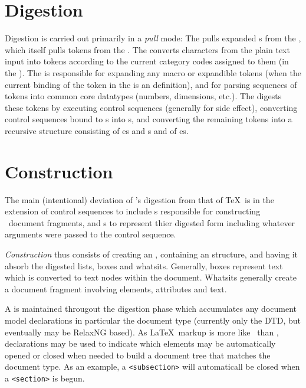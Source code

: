 \documentclass{report}
\begin{document}
\section{Digestion}\label{architecture.digestion}
Digestion is carried out primarily in a \emph{pull} mode: The 
pulls expanded s from the , which itself pulls tokens from 
the .  The  converts characters from the plain text input
into tokens according to the current category codes assigned to them (in the ).  
The  is responsible for expanding any macro or expandible
tokens (when the current binding of the token in the  is 
an  definition), 
and for parsing sequences of tokens into common core datatypes (numbers, dimensions, etc.).
The  digests these tokens by executing  control 
sequences (generally for side effect), converting control sequences bound
to s into s, and converting the remaining tokens
into a recursive structure consisting of
es and s and of es.

\section{Construction}\label{architecture.construction}
The main (intentional) deviation of \LaTeXML's digestion from that of \TeX\ is in the
extension of control sequences to include s responsible for constructing
\XML\ document fragments, and s to represent thier digested form including
whatever arguments were passed to the control sequence.

\emph{Construction} thus consists of creating an , containing
an  structure, and having it absorb the digested lists, boxes
and whatsits.  Generally, boxes represent text which is converted to text nodes within the
document. Whatsits generally create a document fragment involving elements, attributes
and text.  

A  is maintained througout the digestion phase which accumulates
any document model declarations in particular the document type (currently only
the DTD, but eventually may be RelaxNG based).  As \LaTeX\ markup is more
like \SGML\ than \XML, declarations may be used to indicate which elements may
be automatically opened or closed when needed to build a document tree that matches
the document type.  As an example, a \verb|<subsection>| will automaticall be closed
when a \verb|<section>| is begun.
\end{document}
